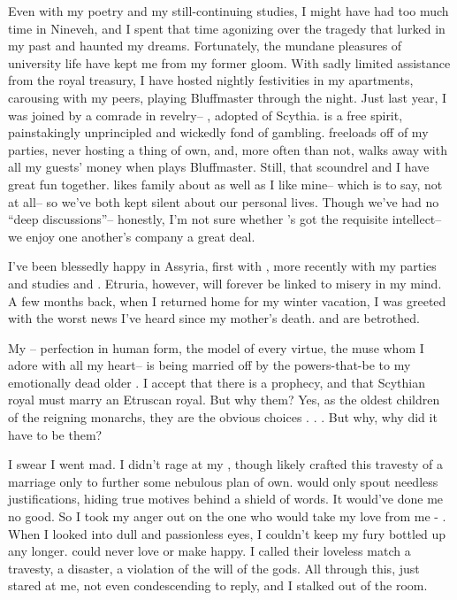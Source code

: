\documentclass[char]{Kos}
\begin{document}
Even with my poetry and my still-continuing studies, I might have had too much time in Nineveh, and I spent that time agonizing over the tragedy that lurked in my past and haunted my dreams. Fortunately, the mundane pleasures of university life have kept me from my former gloom. With sadly limited assistance from the royal treasury, I have hosted nightly festivities in my apartments, carousing with my peers, playing Bluffmaster through the night. Just last year, I was joined by a comrade in revelry-- \cWard{}, adopted \cWard{\prince} of Scythia. \cWard{} is a free spirit, painstakingly unprincipled and wickedly fond of gambling. \cWard{\They} freeloads off of my parties, never hosting a thing of \cWard{\their} own, and, more often than not, \cWard{\they} walks away with all my guests' money when \cWard{\they} plays Bluffmaster. Still, that scoundrel and I have great fun together. \cWard{} likes \cWard{\their} family about as well as I like mine-- which is to say, not at all-- so we've both kept silent about our personal lives. Though we've had no ``deep discussions''-- honestly, I'm not sure whether \cWard{\they}'s got the requisite intellect-- we enjoy one another's company a great deal.

I've been blessedly happy in Assyria, first with \cBride{}, more recently with my parties and studies and \cWard{}. Etruria, however, will forever be linked to misery in my mind. A few months back, when I returned home for my winter vacation, I was greeted with the worst news I've heard since my mother's death. \cBride{} and \cGroom{} are betrothed.

My \cBride{}-- perfection in human form, the model of every virtue, the muse whom I adore with all my heart-- is being married off by the powers-that-be to my emotionally dead older \cGroom{\sibling}. I accept that there is a prophecy, and that Scythian royal must marry an Etruscan royal. But why them? Yes, as the oldest children of the reigning monarchs, they are the obvious choices . . . But why, why did it have to be them? 

I swear I went mad. I didn't rage at my \cEtruriaKing{\parent}, though \cEtruriaKing{\they} likely crafted this travesty of a marriage only to further some nebulous plan of \cEtruriaKing{\their} own. \cEtruriaKing{\they} would only spout needless justifications, hiding \cEtruriaKing{\their} true motives behind a shield of words. It would've done me no good. So I took my anger out on the one who would take my love from me - \cGroom{}. When I looked into \cGroom{\their} dull and passionless eyes, I couldn't keep my fury bottled up any longer. \cGroom{\They} could never love \cBride{} or make \cBride{\them} happy. I called their loveless match a travesty, a disaster, a violation of the will of the gods. All through this, \cGroom{\they} just stared at me, not even condescending to reply, and I stalked out of the room.
\end{document}
